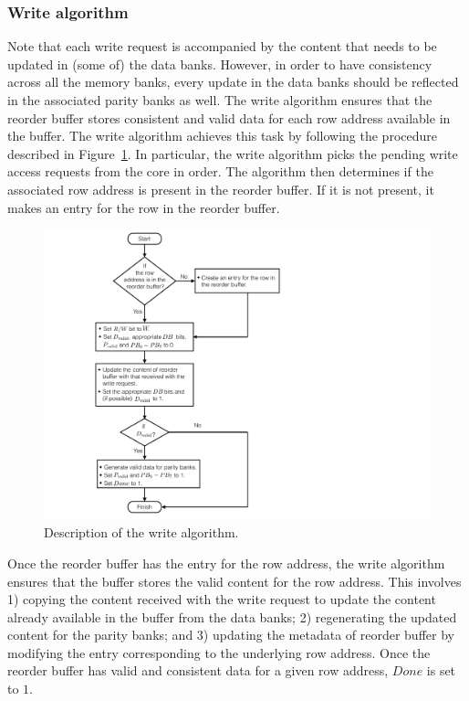 
\subsubsection{Write algorithm}
\label{sec:write}
Note that each write request is accompanied by the content that needs to be updated in (some of) the data banks. However, in order to have consistency across all the memory banks, every update in the data banks should be reflected in the associated parity banks as well. The write algorithm ensures that the reorder buffer stores consistent and valid data for each row address available in the buffer. The write algorithm achieves this task by following the procedure described in Figure~\ref{fig:write}. In particular, the write algorithm picks the pending write access requests from the core in order. The algorithm then determines if the associated row address is present in the reorder buffer. If it is not present, it makes an entry for the row in the reorder buffer. 

\begin{figure}[h!] \centering
\includegraphics[width=0.80\linewidth]{figures/Write-algo-new.pdf} 
\caption{Description of the write algorithm.}
\label{fig:write}
\end{figure}


Once the reorder buffer has the entry for the row address, the write algorithm ensures that the buffer stores the valid content for the row address. This involves 1) copying the content received with the write request to update the content already available in the buffer from the data banks; 2) regenerating the updated content for the parity banks; and 3) updating the metadata of reorder buffer by modifying the entry corresponding to the underlying row address. Once the reorder buffer has valid and consistent data for a given row address, $Done$ is set to $1$. 

